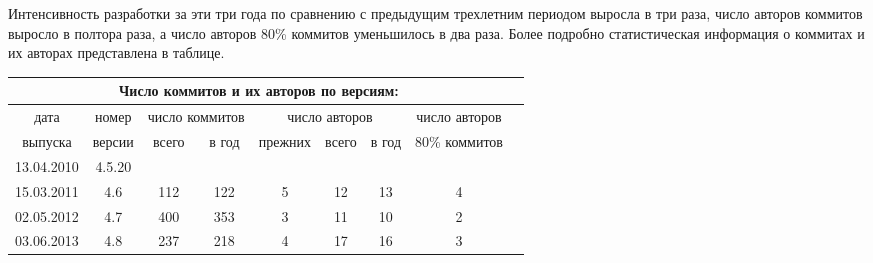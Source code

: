 \documentclass[10pt, a5paper]{article}
\begin{document}
Интенсивность разработки за эти три года по сравнению с предыдущим
трехлетним периодом выросла в три раза, число авторов коммитов выросло в
полтора раза, а число авторов 80\% коммитов уменьшилось в два раза. Более
подробно статистическая информация о коммитах и их авторах представлена в
таблице.
{\footnotesize

\begin{turn}{90} 
\centering

\begin{tabular}{lllllllll}
\hline
\multicolumn{8}{|c|}{Число коммитов и их авторов по версиям:}                                                                                                                                                                                                                         \\ \hline
\multicolumn{1}{|c|}{дата}         & \multicolumn{1}{c|}{номер}  & \multicolumn{2}{c|}{число коммитов}                                    & \multicolumn{3}{c|}{число авторов}                                                                    & \multicolumn{1}{c|}{число авторов} \\ \cline{3-7}
\multicolumn{1}{|c|}{выпуска}      & \multicolumn{1}{c|}{версии} & \multicolumn{1}{c|}{всего}         & \multicolumn{1}{c|}{в год}        & \multicolumn{1}{c|}{прежних}    & \multicolumn{1}{c|}{всего}       & \multicolumn{1}{c|}{в год}       & \multicolumn{1}{c|}{80\% коммитов} \\ \hline
\multicolumn{1}{|c|}{13.04.2010} & \multicolumn{1}{c|}{4.5.20} & \multicolumn{1}{c|}{}              & \multicolumn{1}{c|}{}             & \multicolumn{1}{c|}{}           & \multicolumn{1}{c|}{}            & \multicolumn{1}{c|}{}            & \multicolumn{1}{c|}{}           \\ \hline
\multicolumn{1}{|c|}{15.03.2011} & \multicolumn{1}{c|}{4.6}    & \multicolumn{1}{c|}{112}           & \multicolumn{1}{c|}{122}          & \multicolumn{1}{c|}{5}          & \multicolumn{1}{c|}{12}          & \multicolumn{1}{c|}{13}          & \multicolumn{1}{c|}{4}          \\ \hline
\multicolumn{1}{|c|}{02.05.2012} & \multicolumn{1}{c|}{4.7}    & \multicolumn{1}{c|}{400}           & \multicolumn{1}{c|}{353}          & \multicolumn{1}{c|}{3}          & \multicolumn{1}{c|}{11}          & \multicolumn{1}{c|}{10}          & \multicolumn{1}{c|}{2}          \\ \hline
\multicolumn{1}{|c|}{03.06.2013} & \multicolumn{1}{c|}{4.8}    & \multicolumn{1}{c|}{237}           & \multicolumn{1}{c|}{218}          & \multicolumn{1}{c|}{4}          & \multicolumn{1}{c|}{17}          & \multicolumn{1}{c|}{16}          & \multicolumn{1}{c|}{3}          \\ \hline

\end{tabular}
\end{turn}}
\end{document}

